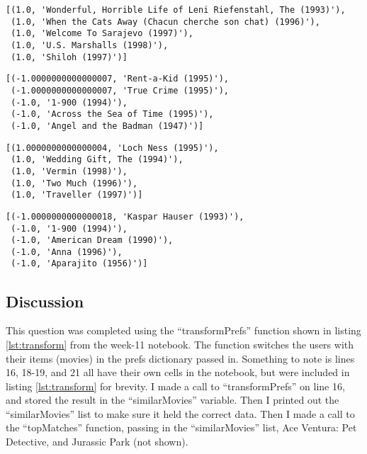 \documentclass[12pt]{article}
\begin{document}
\begin{lstlisting}[caption=Output of calling the topMatches function to get the 5 most correlated movies to Ace Ventura: Pet Detective., label=lst:likeAce ]
[(1.0, 'Wonderful, Horrible Life of Leni Riefenstahl, The (1993)'),
 (1.0, 'When the Cats Away (Chacun cherche son chat) (1996)'),
 (1.0, 'Welcome To Sarajevo (1997)'),
 (1.0, 'U.S. Marshalls (1998)'),
 (1.0, 'Shiloh (1997)')]
\end{lstlisting}

\begin{lstlisting}[caption=Output of calling the topMatches function to get the 5 least correlated movies to Ace Ventura: Pet Detective., label=lst:notlikeAce]
[(-1.0000000000000007, 'Rent-a-Kid (1995)'),
 (-1.0000000000000007, 'True Crime (1995)'),
 (-1.0, '1-900 (1994)'),
 (-1.0, 'Across the Sea of Time (1995)'),
 (-1.0, 'Angel and the Badman (1947)')]
\end{lstlisting}

\begin{lstlisting}[caption=Output of calling the topMatches function to get the 5 most correlated movies to Jurassic Park., label=lst:likeJurassic]
[(1.0000000000000004, 'Loch Ness (1995)'),
 (1.0, 'Wedding Gift, The (1994)'),
 (1.0, 'Vermin (1998)'),
 (1.0, 'Two Much (1996)'),
 (1.0, 'Traveller (1997)')]
\end{lstlisting}

\begin{lstlisting}[caption=Output of calling the topMatches function to get the 5 least correlated moves to Jurassic Park., label=lst:notlikeJurassic]
[(-1.0000000000000018, 'Kaspar Hauser (1993)'),
 (-1.0, '1-900 (1994)'),
 (-1.0, 'American Dream (1990)'),
 (-1.0, 'Anna (1996)'),
 (-1.0, 'Aparajito (1956)')]
\end{lstlisting}

\subsection*{Discussion}

This question was completed using the ``transformPrefs'' function shown in listing \ref{lst:transform} from the week-11 notebook.  The function switches the users with their items (movies) in the prefs dictionary passed in.  Something to note is lines 16, 18-19, and 21 all have their own cells in the notebook, but were included in listing \ref{lst:transform} for brevity.  I made a call to ``transformPrefs'' on line 16, and stored the result in the ``similarMovies'' variable.  Then I printed out the ``similarMovies'' list to make sure it held the correct data.  Then I made a call to the ``topMatches'' function, passing in the ``similarMovies'' list, Ace Ventura: Pet Detective, and Jurassic Park (not shown).
\end{document}
